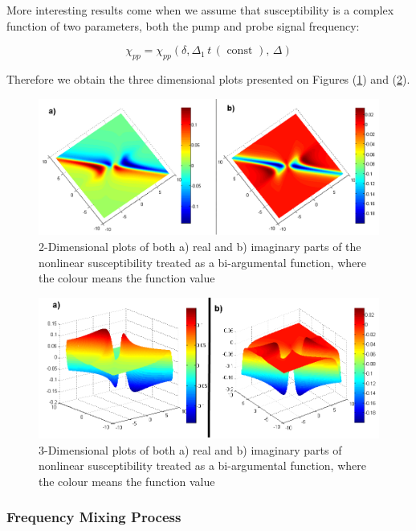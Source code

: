 \documentclass[12pt,twoside,a4paper]{article}
\numberwithin{equation}{subsection}
\numberwithin{figure}{subsection}
\begin{document}
More interesting results come when we assume that susceptibility is a complex function of two parameters, both the pump and
probe signal frequency:

\begin{equation} \label{eq:pnp_2args}
  \chi_{pp} = \chi_{pp}(\delta, \Delta_1 \, t \, (\text{ const }), \,\Delta )
\end{equation}

Therefore we obtain the three dimensional plots presented on Figures (\ref{fig:physical_pnp_2d}) and (\ref{fig:physical_pnp_3d}).

\begin{figure}
  \includegraphics[width=150mm]{img/pnp_2d.png}
  \caption{2-Dimensional plots of both a) real and b) imaginary parts of the nonlinear susceptibility treated as a bi-argumental
  function, where the colour means the function value
  \label{fig:physical_pnp_2d}}
\end{figure}

\begin{figure} 
  \includegraphics[width=150mm]{img/pnp_3d.png}
  \caption{3-Dimensional plots of both a) real and b) imaginary parts of nonlinear susceptibility treated as a bi-argumental
  function, where the colour means the function value
  \label{fig:physical_pnp_3d}}
\end{figure}


\subsubsection*{Frequency Mixing Process} \label{chap:physical_fm}
\end{document}
